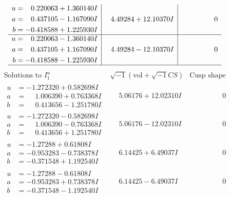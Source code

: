 \documentclass[1p]{elsarticle_modified}
\theoremstyle{definition}
\newcommand{\I}{\sqrt{-1}}
\begin{document}
$$\begin{array}{c|c|c}
\begin{aligned}
u &= \phantom{-}0.220063 + 1.360140 I \\
a &= \phantom{-}0.437105 - 1.167090 I \\
b &= -0.418588 + 1.225930 I\end{aligned}
 & \phantom{-}4.49284 + 12.10370 I & \phantom{-0.000000 } 0 \\ \hline\begin{aligned}
u &= \phantom{-}0.220063 - 1.360140 I \\
a &= \phantom{-}0.437105 + 1.167090 I \\
b &= -0.418588 - 1.225930 I\end{aligned}
 & \phantom{-}4.49284 - 12.10370 I & \phantom{-0.000000 } 0\\
 \hline 
 \end{array}$$\newpage$$\begin{array}{c|c|c}  
\text{Solutions to }I^u_{1}& \I (\text{vol} + \sqrt{-1}CS) & \text{Cusp shape}\\
 \hline 
\begin{aligned}
u &= -1.272320 + 0.582698 I \\
a &= \phantom{-}1.006390 + 0.763368 I \\
b &= \phantom{-}0.413656 - 1.251780 I\end{aligned}
 & \phantom{-}5.06176 + 12.02310 I & \phantom{-0.000000 } 0 \\ \hline\begin{aligned}
u &= -1.272320 - 0.582698 I \\
a &= \phantom{-}1.006390 - 0.763368 I \\
b &= \phantom{-}0.413656 + 1.251780 I\end{aligned}
 & \phantom{-}5.06176 - 12.02310 I & \phantom{-0.000000 } 0 \\ \hline\begin{aligned}
u &= -1.27288 + 0.61808 I \\
a &= -0.953283 - 0.738378 I \\
b &= -0.371548 + 1.192540 I\end{aligned}
 & \phantom{-}6.14425 + 6.49037 I & \phantom{-0.000000 } 0 \\ \hline\begin{aligned}
u &= -1.27288 - 0.61808 I \\
a &= -0.953283 + 0.738378 I \\
b &= -0.371548 - 1.192540 I\end{aligned}
 & \phantom{-}6.14425 - 6.49037 I & \phantom{-0.000000 } 0 \\ \hline\begin{aligned}

\end{aligned}
\end{array}$$
\end{document}

